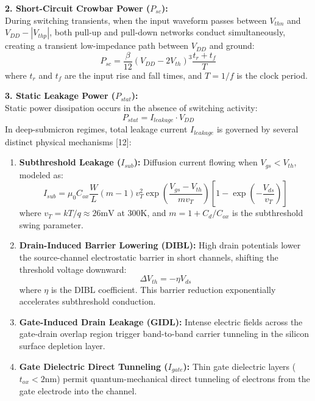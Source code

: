 \documentclass[12pt,a4paper,oneside]{report}
\begin{document}
\noindent\textbf{2. Short-Circuit Crowbar Power ($P_{sc}$):}\\
During switching transients, when the input waveform passes between $V_{thn}$ and $V_{DD} - |V_{thp}|$, both pull-up and pull-down networks conduct simultaneously, creating a transient low-impedance path between $V_{DD}$ and ground:
\begin{equation}
P_{sc} = \frac{\beta}{12} (V_{DD} - 2V_{th})^3 \frac{t_r + t_f}{T}
\label{eq:psc_form}
\end{equation}
where $t_r$ and $t_f$ are the input rise and fall times, and $T = 1/f$ is the clock period.

\noindent\textbf{3. Static Leakage Power ($P_{stat}$):}\\
Static power dissipation occurs in the absence of switching activity:
\begin{equation}
P_{stat} = I_{leakage} \cdot V_{DD}
\end{equation}
In deep-submicron regimes, total leakage current $I_{leakage}$ is governed by several distinct physical mechanisms [12]:
\begin{enumerate}
\item \textbf{Subthreshold Leakage ($I_{sub}$):} Diffusion current flowing when $V_{gs} < V_{th}$, modeled as:
\begin{equation}
I_{sub} = \mu_0 C_{ox} \frac{W}{L} (m-1) v_T^2 \exp\left(\frac{V_{gs} - V_{th}}{m v_T}\right) \left[1 - \exp\left(-\frac{V_{ds}}{v_T}\right)\right]
\label{eq:isub_form}
\end{equation}
where $v_T = kT/q \approx 26\text{mV}$ at $300\text{K}$, and $m = 1 + C_d/C_{ox}$ is the subthreshold swing parameter.
\item \textbf{Drain-Induced Barrier Lowering (DIBL):} High drain potentials lower the source-channel electrostatic barrier in short channels, shifting the threshold voltage downward:
\begin{equation}
\Delta V_{th} = -\eta V_{ds}
\end{equation}
where $\eta$ is the DIBL coefficient. This barrier reduction exponentially accelerates subthreshold conduction.
\item \textbf{Gate-Induced Drain Leakage (GIDL):} Intense electric fields across the gate-drain overlap region trigger band-to-band carrier tunneling in the silicon surface depletion layer.
\item \textbf{Gate Dielectric Direct Tunneling ($I_{gate}$):} Thin gate dielectric layers ($t_{ox} < 2\text{nm}$) permit quantum-mechanical direct tunneling of electrons from the gate electrode into the channel.
\end{enumerate}
\end{document}
